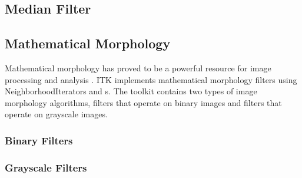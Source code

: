 \subsection{Median Filter}
\label{sec:MedianFilter}

\ifitkFullVersion

\fi


\subsection{Mathematical Morphology}
\label{sec:MathematicalMorphology}

Mathematical morphology has proved to be a powerful resource for image
processing and analysis \cite{Serra1982}. ITK implements mathematical
morphology filters using NeighborhoodIterators and
s.  The toolkit contains two types of image
morphology algorithms, filters that operate on binary images and filters that
operate on grayscale images.

\subsubsection{Binary Filters}
\label{sec:MathematicalMorphologyBinaryFilters}

\ifitkFullVersion

\fi


\subsubsection{Grayscale Filters}
\label{sec:MathematicalMorphologyGrayscaleFilters}

\ifitkFullVersion

\fi




